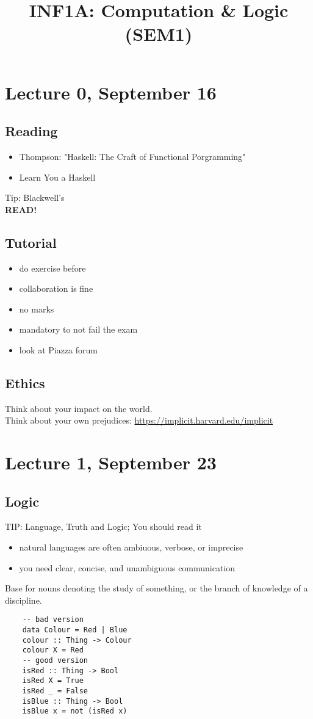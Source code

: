 \documentclass{article}
\begin{document}
\title{INF1A: Computation \& Logic (SEM1)}
\tableofcontents
\pagebreak
\section{Lecture 0, September 16}
\subsection{Reading}
\begin{itemize}
    \item Thompson: "Haskell: The Craft of Functional Porgramming"
    \item Learn You a Haskell
\end{itemize}
Tip: Blackwell's\\
\textbf{READ!}
\subsection{Tutorial}
\begin{itemize}
    \item do exercise before
    \item collaboration is fine
    \item no marks
    \item mandatory to not fail the exam
\end{itemize}
\begin{itemize}
    \item look at Piazza forum
\end{itemize}
\subsection{Ethics}
Think about your impact on the world.\\
Think about your own prejudices:
\url{https://implicit.harvard.edu/implicit}
\section{Lecture 1, September 23}
\subsection{Logic}
TIP: Language, Truth and Logic; You should read it
\begin{itemize}
    \item natural languages are often ambiuous, verbose, or imprecise
    \item you need clear, concise, and unambiguous communication   
\end{itemize}
Base for nouns denoting the study of something, or the branch of knowledge of a discipline.
\begin{verbatim}
    -- bad version
    data Colour = Red | Blue
    colour :: Thing -> Colour
    colour X = Red
    -- good version
    isRed :: Thing -> Bool
    isRed X = True
    isRed _ = False
    isBlue :: Thing -> Bool
    isBlue x = not (isRed x)
\end{verbatim}
\end{document}
